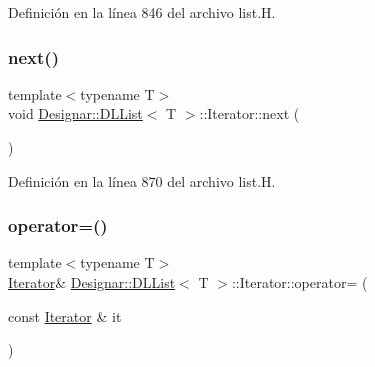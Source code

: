 Definición en la línea 846 del archivo list.\+H.

\mbox{\label{class_designar_1_1_d_l_list_1_1_iterator_ac4eb0645c0e4e68057bf0bc05cf3c8c3}} 
\subsubsection{\texorpdfstring{next()}{next()}}
{\footnotesize\ttfamily template$<$typename T$>$ \\
void \hyperlink{class_designar_1_1_d_l_list}{Designar\+::\+D\+L\+List}$<$ T $>$\+::Iterator\+::next (\begin{DoxyParamCaption}{ }\end{DoxyParamCaption})\hspace{0.3cm}{\ttfamily [inline]}}



Definición en la línea 870 del archivo list.\+H.

\mbox{\label{class_designar_1_1_d_l_list_1_1_iterator_a292588690dcaa7acc2311a92e535424e}} 
\subsubsection{\texorpdfstring{operator=()}{operator=()}\hspace{0.1cm}{\footnotesize\ttfamily [1/2]}}
{\footnotesize\ttfamily template$<$typename T$>$ \\
\hyperlink{class_designar_1_1_d_l_list_1_1_iterator}{Iterator}\& \hyperlink{class_designar_1_1_d_l_list}{Designar\+::\+D\+L\+List}$<$ T $>$\+::Iterator\+::operator= (\begin{DoxyParamCaption}\item[{const \hyperlink{class_designar_1_1_d_l_list_1_1_iterator}{Iterator} \&}]{it }\end{DoxyParamCaption})\hspace{0.3cm}{\ttfamily [inline]}}



